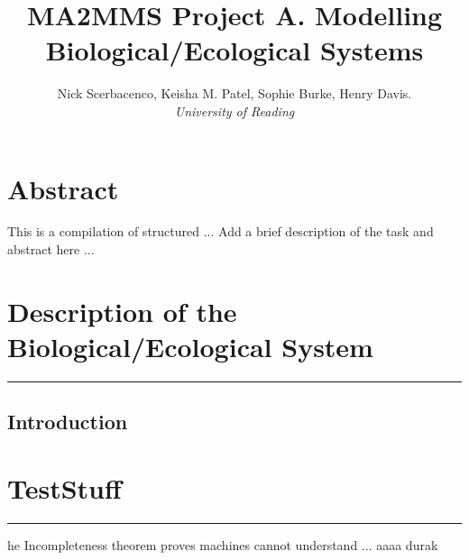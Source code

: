\documentclass[11pt]{article}
\title{\textbf{MA2MMS Project A. Modelling Biological/Ecological Systems}}
\author{Nick Scerbacenco, Keisha M. Patel, Sophie Burke, Henry Davis. \\
        \textit{University of Reading}}
\date{ }
\begin{document}
\pagestyle{fancy}


\maketitle
\thispagestyle{empty} 

\section*{\textbf{Abstract}}
This is a compilation of structured ... Add a brief description of the task and abstract here ...

\tableofcontents

\newpage


\section{Description of the Biological/Ecological System}
\hrule height 0.8pt 
\vspace{5mm}

\subsection{Introduction}


\newpage
\section{TestStuff}
\hrule height 0.8pt 
\vspace{5mm}

\lettrine[findent=2pt]{}{ } he Incompleteness theorem proves machines cannot understand ...
aaaa durak

\end{document}
